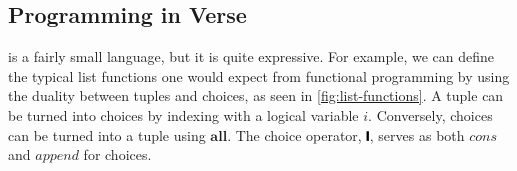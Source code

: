 \documentclass[acmsmall,review,anonymous,dvipsnames]{acmart}
\newcommand{\Varid}[1]{\mathit{#1}}
\begin{document}



\subsection{Programming in Verse}  \label{sec:verse}

\versecalc{} is a fairly small language, but it is quite expressive.
For example, we can define the typical list functions one would expect from functional programming
by using the duality between tuples and choices, as seen in \cref{fig:list-functions}.
A tuple can be turned into choices by indexing with a logical variable \ensuremath{\Varid{i}}.
Conversely, choices can be turned into a tuple using \ensuremath{\textbf{all}}.
The choice operator, \ensuremath{\rule[-0.3mm]{0.5mm}{2.5mm}}, serves as both \ensuremath{\Varid{cons}} and \ensuremath{\Varid{append}} for choices.
\end{document}
